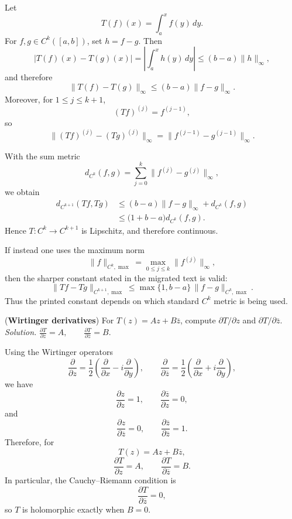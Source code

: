 \begin{solution}
Let
\[
T(f)(x)=\int_a^x f(y)\,dy.
\]
For \(f,g\in C^k([a,b])\), set \(h=f-g\). Then
\[
|T(f)(x)-T(g)(x)|
=
\left|\int_a^x h(y)\,dy\right|
\le
(b-a)\|h\|_\infty,
\]
and therefore
\[
\|T(f)-T(g)\|_\infty
\le
(b-a)\|f-g\|_\infty.
\]
Moreover, for \(1\le j\le k+1\),
\[
(Tf)^{(j)}=f^{(j-1)},
\]
so
\[
\|(Tf)^{(j)}-(Tg)^{(j)}\|_\infty
=
\|f^{(j-1)}-g^{(j-1)}\|_\infty.
\]

With the sum metric
\[
d_{C^k}(f,g)
=
\sum_{j=0}^{k}\|f^{(j)}-g^{(j)}\|_\infty,
\]
we obtain
\[
\begin{aligned}
d_{C^{k+1}}(Tf,Tg)
&\le
(b-a)\|f-g\|_\infty+d_{C^k}(f,g)\\
&\le
\bigl(1+b-a\bigr)d_{C^k}(f,g).
\end{aligned}
\]
Hence \(T:C^k\to C^{k+1}\) is Lipschitz, and therefore continuous.

If instead one uses the maximum norm
\[
\|f\|_{C^k,\max}
=
\max_{0\le j\le k}\|f^{(j)}\|_\infty,
\]
then the sharper constant stated in the migrated text is valid:
\[
\boxed{
\|Tf-Tg\|_{C^{k+1},\max}
\le
\max\{1,b-a\}\,
\|f-g\|_{C^k,\max}.
}
\]
Thus the printed constant depends on which standard \(C^k\) metric is being used.
\end{solution}


\begin{problem}[CP-IV-0101]
\label{prob:cp-iv-0101}
\par\noindent\textbullet\quad (\textbf{Wirtinger derivatives})
	For $T(z)=Az+B\bar z$, compute $\partial T/\partial z$ and $\partial T/\partial\bar z$.
	\emph{Solution.} $\displaystyle \frac{\partial T}{\partial z}=A,\qquad \frac{\partial T}{\partial\bar z}=B$.
\end{problem}

\begin{solution}
Using the Wirtinger operators
\[
\frac{\partial}{\partial z}
=
\frac12\left(
\frac{\partial}{\partial x}
-i\frac{\partial}{\partial y}
\right),
\qquad
\frac{\partial}{\partial\overline z}
=
\frac12\left(
\frac{\partial}{\partial x}
+i\frac{\partial}{\partial y}
\right),
\]
we have
\[
\frac{\partial z}{\partial z}=1,
\qquad
\frac{\partial\overline z}{\partial z}=0,
\]
and
\[
\frac{\partial z}{\partial\overline z}=0,
\qquad
\frac{\partial\overline z}{\partial\overline z}=1.
\]
Therefore, for
\[
T(z)=Az+B\overline z,
\]
\[
\boxed{
\frac{\partial T}{\partial z}=A,
\qquad
\frac{\partial T}{\partial\overline z}=B.
}
\]
In particular, the Cauchy--Riemann condition is
\[
\frac{\partial T}{\partial\overline z}=0,
\]
so \(T\) is holomorphic exactly when \(B=0\).
\end{solution}


